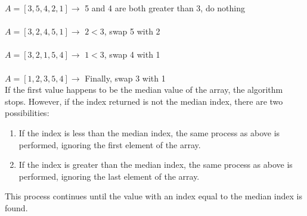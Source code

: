 \documentclass{article}
\begin{document}
        \noindent$A = [3, 5, 4, 2, 1] \rightarrow$  5 and 4 are both greater than 3, do nothing\\\\
        $A = [3, 2, 4, 5, 1] \rightarrow$  $2 < 3$, swap 5 with 2\\\\
        $A = [3, 2, 1, 5, 4] \rightarrow$  $1 < 3$, swap 4 with 1\\\\
        $A = [1, 2, 3, 5, 4] \rightarrow$  Finally, swap 3 with 1\\

        If the first value happens to be the median value of the array, the algorithm stops. However, if the index returned is not the median index, there are two possibilities:

        \begin{enumerate}
            \item If the index is less than the median index, the same process as above is performed, ignoring the first element of the array.
            \item If the index is greater than the median index, the same process as above is performed, ignoring the last element of the array.
        \end{enumerate}

        This process continues until the value with an index equal to the median index is found.
\end{document}
